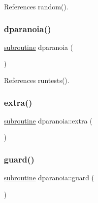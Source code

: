 References random().

\mbox{\label{dparanoia_8f90_aea61249b658024bcb8b5812d70a64b93}} 
\subsubsection{\texorpdfstring{dparanoia()}{dparanoia()}}
{\footnotesize\ttfamily \hyperlink{M__stopwatch_83_8txt_acfbcff50169d691ff02d4a123ed70482}{subroutine} dparanoia (\begin{DoxyParamCaption}{ }\end{DoxyParamCaption})}



References runtests().

\mbox{\label{dparanoia_8f90_a8b0cecca050456b522805e7a3ebe3398}} 
\subsubsection{\texorpdfstring{extra()}{extra()}}
{\footnotesize\ttfamily \hyperlink{M__stopwatch_83_8txt_acfbcff50169d691ff02d4a123ed70482}{subroutine} dparanoia\+::extra (\begin{DoxyParamCaption}{ }\end{DoxyParamCaption})}

\mbox{\label{dparanoia_8f90_a50f1e7cdd1eb06f040fb16cc2e7c65e7}} 
\subsubsection{\texorpdfstring{guard()}{guard()}}
{\footnotesize\ttfamily \hyperlink{M__stopwatch_83_8txt_acfbcff50169d691ff02d4a123ed70482}{subroutine} dparanoia\+::guard (\begin{DoxyParamCaption}{ }\end{DoxyParamCaption})}

\mbox{\label{dparanoia_8f90_a86b4fbb4f2e0083655b4f87fea7c9774}} 
